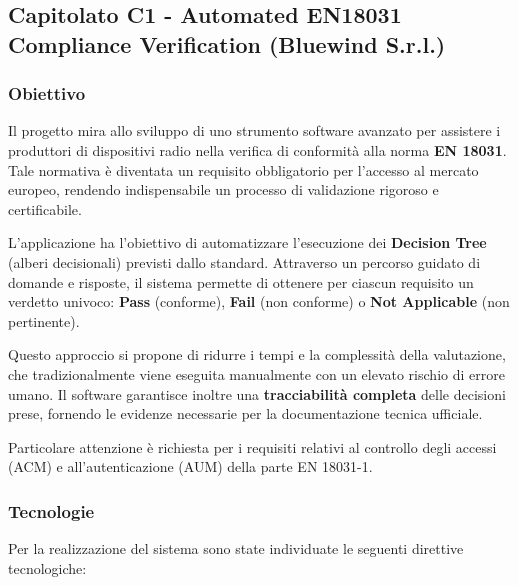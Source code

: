 \documentclass[a4paper, 10pt, colorlinks=true, linkcolor=black, urlcolor=blue, citecolor=blue, hidelinks]{article}
\begin{document}
\subsection{Capitolato C1 - Automated EN18031 Compliance Verification (Bluewind S.r.l.)}

\subsubsection{Obiettivo}

Il progetto mira allo sviluppo di uno strumento software avanzato per assistere i produttori di dispositivi radio nella verifica di conformità alla norma \textbf{EN 18031}. Tale normativa è diventata un requisito obbligatorio per l'accesso al mercato europeo, rendendo indispensabile un processo di validazione rigoroso e certificabile.

L’applicazione ha l'obiettivo di automatizzare l’esecuzione dei \textbf{Decision Tree} (alberi decisionali) previsti dallo standard. Attraverso un percorso guidato di domande e risposte, il sistema permette di ottenere per ciascun requisito un verdetto univoco: \textbf{Pass} (conforme), \textbf{Fail} (non conforme) o \textbf{Not Applicable} (non pertinente).

Questo approccio si propone di ridurre i tempi e la complessità della valutazione, che tradizionalmente viene eseguita manualmente con un elevato rischio di errore umano. Il software garantisce inoltre una \textbf{tracciabilità completa} delle decisioni prese, fornendo le evidenze necessarie per la documentazione tecnica ufficiale.

Particolare attenzione è richiesta per i requisiti relativi al controllo degli accessi (ACM) e all’autenticazione (AUM) della parte EN 18031-1.

\subsubsection{Tecnologie}

Per la realizzazione del sistema sono state individuate le seguenti direttive tecnologiche:
\end{document}
